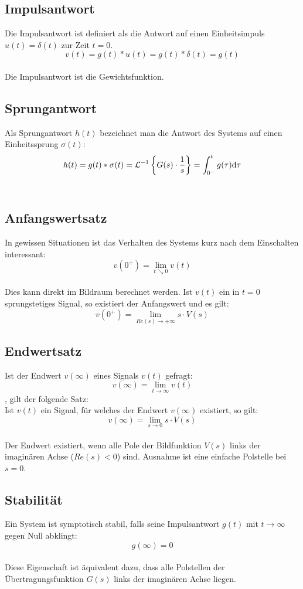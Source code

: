 \subsection{Impulsantwort}
Die Impulsantwort ist definiert als die Antwort auf einen Einheitsimpuls $u(t) = \delta(t)$ zur Zeit $t=0$.
\[
	v(t) = g(t) \ast u(t) = g(t) \ast \delta(t) = g(t)
\]
\\
Die Impulsantwort ist die Gewichtsfunktion.
\\

\subsection{Sprungantwort}
Als Sprungantwort $h(t)$ bezeichnet man die Antwort des Systems auf einen Einheitssprung $\sigma(t)$:
\[
	h(t) = g(t) \ast \sigma(t) = \mathcal{L}^{-1}\left\lbrace G(s) \cdot \frac{1}{s} \right\rbrace = \int_{0^-}^{t} g(\tau) \mathrm{d} \tau
\]
\\

\subsection{Anfangswertsatz}
In gewissen Situationen ist das Verhalten des Systems kurz nach dem Einschalten interessant:
\[
	v(0^+) = \lim\limits_{t \searrow 0}v(t)
\]
\\
Dies kann direkt im Bildraum berechnet werden. Ist $v(t)$ ein in $t=0$ sprungstetiges Signal, so existiert der Anfangswert und es gilt:
\[
	v(0^+) = \lim\limits_{Re(s)\rightarrow + \infty} s\cdot V(s)
\]

\subsection{Endwertsatz}
Ist der Endwert $v(\infty)$ eines Signals $v(t)$ gefragt:
\[
	v(\infty) = \lim\limits_{t \rightarrow \infty} v(t)
\]
, gilt der folgende Satz:\\
Ist $v(t)$ ein Signal, für welches der Endwert $v(\infty)$ existiert, so gilt:
\[
	v(\infty) = \lim\limits_{s \rightarrow 0} s \cdot V(s)
\]
\\
Der Endwert existiert, wenn alle Pole der Bildfunktion $V(s)$ links der imaginären Achse ($Re(s)<0$) sind. Ausnahme ist eine einfache Polstelle bei $s=0$.
\\

\subsection{Stabilität}
Ein System ist symptotisch stabil, falls seine Impulsantwort $g(t)$ mit $t \rightarrow \infty$ gegen Null abklingt:
\[
	g(\infty) = 0
\]
\\
Diese Eigenschaft ist äquivalent dazu, dass alle Polstellen der Übertragungsfunktion $G(s)$ links der imaginären Achse liegen.